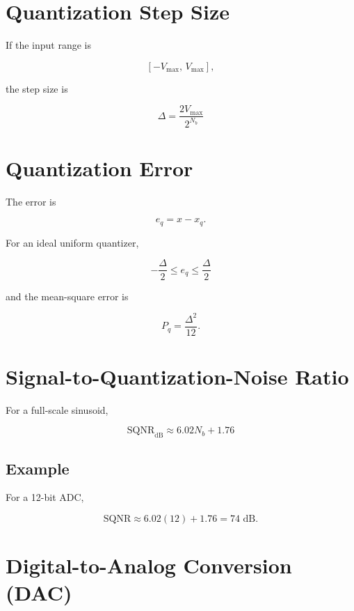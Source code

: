 
\section{Quantization Step Size}

If the input range is

\[
[-V_{\max},\,V_{\max}],
\]

the step size is

\[
\boxed{
\Delta=
\frac{2V_{\max}}{2^{N_b}}
}
\]


\section{Quantization Error}

The error is

\[
e_q=x-x_q.
\]

For an ideal uniform quantizer,

\[
\boxed{
-\frac{\Delta}{2}\le e_q\le\frac{\Delta}{2}
}
\]

and the mean-square error is

\[
\boxed{
P_q=\frac{\Delta^2}{12}.
}
\]


\section{Signal-to-Quantization-Noise Ratio}

For a full-scale sinusoid,

\[
\boxed{
\text{SQNR}_{\text{dB}}
\approx
6.02N_b+1.76
}
\]


\subsection{Example}

For a 12-bit ADC,

\[
\text{SQNR}\approx
6.02(12)+1.76
=
74\text{ dB}.
\]


\section{Digital-to-Analog Conversion (DAC)}

